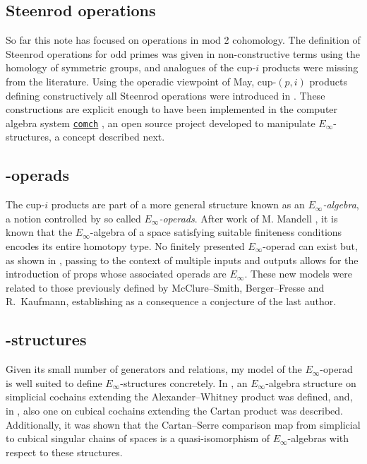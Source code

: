 \subsection{Steenrod operations} \label{ss:may steenrod}

So far this note has focused on operations in mod 2 cohomology.
The definition of Steenrod operations for odd primes was given in non-constructive terms using the homology of symmetric groups, and analogues of the cup-$i$ products were missing from the literature.
Using the operadic viewpoint of May, cup-$(p,i)$ products defining constructively all Steenrod operations
were introduced in \cite{medina2021may_st}.
These constructions are explicit enough to have been implemented in the computer algebra system \href{https://comch.readthedocs.io/en/latest/}{\texttt{comch}} \cite{medina2021comch}, an open source project developed to manipulate $E_\infty$-structures, a concept described next.

\subsection{\pdfEinfty-operads}

The cup-$i$ products are part of a more general structure known as an \textit{$E_\infty$-algebra}, a notion controlled by so called \textit{$E_\infty$-operads}.
After work of M. Mandell \cite{mandell2006cochains}, it is known that the $E_\infty$-algebra of a space satisfying suitable finiteness conditions encodes its entire homotopy type.
No finitely presented $E_\infty$-operad can exist but, as shown in \cite{medina2020prop1,medina2021prop2}, passing to the context of multiple inputs and outputs allows for the introduction of props whose associated operads are $E_\infty$.
These new models were related to those previously defined by McClure--Smith, Berger--Fresse and R.~Kaufmann, establishing as a consequence a conjecture of the last author.

\subsection{\pdfEinfty-structures} \label{ss:e-infty structures}

Given its small number of generators and relations, my model of the $E_\infty$-operad is well suited to define $E_{\infty}$-structures concretely.
In \cite{medina2020prop1}, an $E_\infty$-algebra structure on simplicial cochains extending the Alexander--Whitney product was defined, and, in \cite{medina2022cube_einfty}, also one on cubical cochains extending the Cartan product was described.
Additionally, it was shown that the Cartan--Serre comparison map from simplicial to cubical singular chains of spaces is a quasi-isomorphism of $E_\infty$-algebras with respect to these structures.

